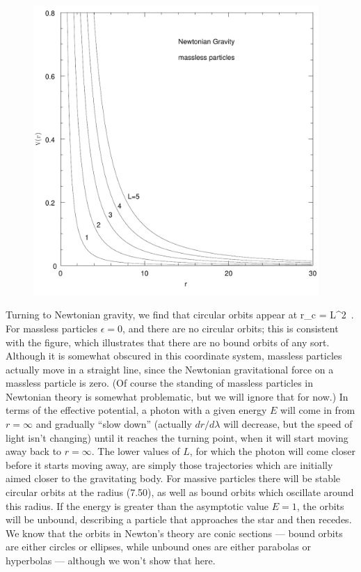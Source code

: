 \documentclass[12pt]{article}
\begin{document}
\begin{figure}
  \centerline{
  \includegraphics[height=11cm]{pdf/seven5}}
  \vskip-2cm
\end{figure}

Turning to Newtonian gravity, we find that circular orbits appear at
\be
  r_c = {{L^2}}\ .\label{7.50}
\ee
For massless particles $\epsilon=0$, and there are no circular orbits;
this is consistent with the figure, which illustrates that there are no
bound orbits of any sort.  Although it is somewhat obscured in this
coordinate system, massless particles actually move in a straight
line, since the Newtonian gravitational force on a massless particle is
zero.  (Of course the standing of massless particles in Newtonian theory
is somewhat problematic, but we will ignore that for now.)  In terms of
the effective potential, a photon with a given energy $E$ will come in 
from $r=\infty$ and gradually ``slow down'' (actually $dr/d\lambda$
will decrease, but the speed of light isn't changing) until it reaches
the turning point, when it will start moving away back to 
$r=\infty$.  The lower values of $L$, for which the photon will come
closer before it starts moving away, are simply those trajectories which
are initially aimed closer to the gravitating body.
For massive particles there will be stable circular orbits at the
radius (7.50), as well as bound orbits which oscillate around this
radius.  If the energy is greater than the asymptotic value $E=1$,
the orbits will be unbound, describing a particle that approaches the
star and then recedes.  We know that the orbits in Newton's theory are
conic sections --- bound orbits are either circles or ellipses, while
unbound ones are either parabolas or hyperbolas --- although we won't
show that here.
\end{document}
